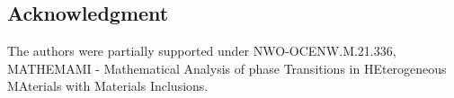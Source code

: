 \documentclass[a4paper, 11pt, reqno]{amsart}
\theoremstyle{plain}
\theoremstyle{definition}
\theoremstyle{remark}
\begin{document}
\subsection*{Acknowledgment}
The authors were partially supported under NWO-OCENW.M.21.336, MATHEMAMI - Mathematical Analysis of phase Transitions in HEterogeneous MAterials with Materials Inclusions.








\end{document}
